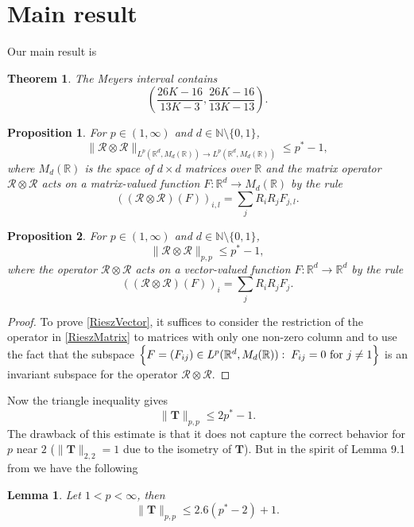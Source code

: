 \documentclass[12pt,reqno]{amsart}
\newtheorem{theorem}{Theorem}
\newtheorem{prop}{Proposition}
\newtheorem{lemma}{Lemma}
\newcommand{\R}{{\mathbb R}}
\newcommand{\RV}{{\mathcal R}}
\newcommand{\T}{{\mathbf T}}
\newcommand{\RO}{{\RV\otimes\RV}}
\begin{document}
\section{Main result}
Our main result is
\begin{theorem}\label{main} The Meyers interval contains
$$\left(\frac{26K-16}{13K-3}, \frac{26K-16}{13K-13}\right).$$
\end{theorem}
\begin{prop}\label{eq:Cassese} \cite[Proposition 4.1]{Cassese}
For $p\in(1,\infty)$ and $d\in {\mathbb N}\setminus\{0,1\}$,
\begin{equation}\label{RieszMatrix}
\|\RO\|_{L^p(\R^d,M_d(\R))\to L^p(\R^d, M_d(\R))}\le p^*-1,
\end{equation}
where $M_d(\R)$ is the space of $d\times d$ matrices over $\R$ and the matrix operator $\RO$ acts on a matrix-valued function $F\colon\R^d\to M_d(\R)$ by the rule
\begin{equation*}
((\RO)(F))_{i,l}=\sum\limits_j R_i R_j F_{j,l}.
\end{equation*}
\end{prop}
\begin{prop}\label{eq:Cassese2}
For $p\in(1,\infty)$ and $d\in {\mathbb N}\setminus\{0,1\}$,
\begin{equation}\label{RieszVector}
\|\RO\|_{p,p}\le p^*-1,
\end{equation}
where the operator $\RO$ acts on a vector-valued function $F\colon\R^d\to \R^d$ by the rule
\begin{equation*}
((\RO)(F))_{i}=\sum\limits_j R_i R_j F_{j}.
\end{equation*}
\end{prop}
\begin{proof}
To prove \eqref{RieszVector}, it suffices to consider the restriction of the operator in \eqref{RieszMatrix} to matrices with only one non-zero column and to use the fact that the subspace
$\Bigl\{F=(F_{ij}) \in L^p(\R^d,M_d(\R)):\;F_{ij}=0 \text{ for } j\neq 1\Bigr\}$
is an invariant subspace for the operator $\RO$.
\end{proof}
Now the triangle inequality gives
\begin{equation*}
\|\T\|_{p,p}\leq 2p^*-1.
\end{equation*}
The drawback of this estimate is that it does not capture the correct behavior for $p$ near $2$ ($\|\T\|_{2,2}=1$ due to the isometry of $\T$). But in the spirit of Lemma 9.1 from \cite{IS2001} we have the following
\begin{lemma}\label{InterpolLemma}
Let $1<p< \infty$, then
\begin{equation}\label{Interpol26}
\|\T\|_{p,p}\le 2.6(p^*-2)+1.
\end{equation}
\end{lemma}
\end{document}
